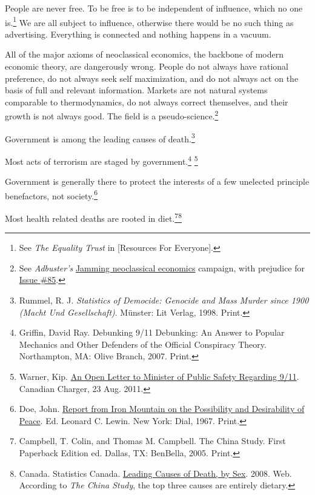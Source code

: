 \item
People are never free. To be free is to be independent of influence, which no one is.\footnote{See {\it The Equality Trust} in [Resources For Everyone].} We are all subject to influence, otherwise there would be no such thing as advertising. Everything is connected and nothing happens in a vacuum.

\item
All of the major axioms of neoclassical economics, the backbone of modern economic theory, are dangerously wrong. People do not always have rational preference, do not always seek self maximization, and do not always act on the basis of full and relevant information. Markets are not natural systems comparable to thermodynamics, do not always correct themselves, and their growth is not always good. The field is a pseudo-science.\footnote{See {\it Adbuster's} \href{http://anticap.wordpress.com/2010/10/25/jamming-neoclassical-economics/}{Jamming neoclassical economics} campaign, with prejudice for \href{http://www.adbusters.org/cultureshop/backissues/85}{Issue \#85}.}

\item
Government is among the leading causes of death.\footnote{Rummel, R. J. {\it Statistics of Democide: Genocide and Mass Murder since 1900 (Macht Und Gesellschaft)}. Münster: Lit Verlag, 1998. Print.}

\item
Most acts of terrorism are staged by government.\footnote{Griffin, David Ray. {Debunking 9/11 Debunking: An Answer to Popular Mechanics and Other Defenders of the Official Conspiracy Theory}. Northampton, MA: Olive Branch, 2007. Print.} \footnote{Warner, Kip. \href{http://www.thecanadiancharger.com/page.php?id=5}{An Open Letter to Minister of Public Safety Regarding 9/11}. Canadian Charger, 23 Aug. 2011.}

\item
Government is generally there to protect the interests of a few unelected principle benefactors, not society.\footnote{Doe, John. \href{http://www.teachpeace.com/Report_from_Iron_Mountain.pdf}{Report from Iron Mountain on the Possibility and Desirability of Peace}. Ed. Leonard C. Lewin. New York: Dial, 1967. Print.}

\item
Most health related deaths are rooted in diet.\footnote{Campbell, T. Colin, and Thomas M. Campbell. {The China Study}. First Paperback Edition ed. Dallas, TX: BenBella, 2005. Print.}\footnote{Canada. Statistics Canada. \href{http://www.statcan.gc.ca/tables-tableaux/sum-som/l01/cst01/hlth36a-eng.htm}{Leading Causes of Death, by Sex}. 2008. Web. 
According to {\it The China Study}, the top three causes are entirely dietary.}

